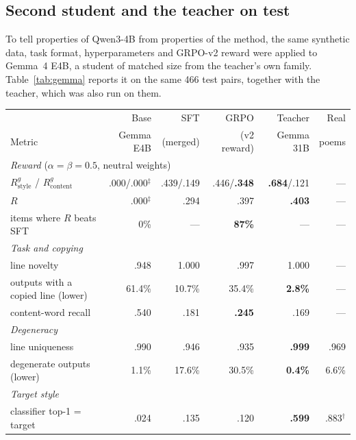 \documentclass[11pt]{article}
\begin{document}
\subsection{Second student and the teacher on test}\label{sec:gemma}

To tell properties of Qwen3-4B from properties of the method, the same
synthetic data, task format, hyperparameters and GRPO-v2 reward were applied
to Gemma~4 E4B, a student of matched size from the teacher's own family.
Table~\ref{tab:gemma} reports it on the same 466 test pairs, together with the
teacher, which was also run on them.

\begin{table}[ht]
\centering\small
\begin{tabular}{lrrrrr}
\toprule
& Base & SFT & GRPO & Teacher & Real \\
Metric & Gemma E4B & (merged) & (v2 reward) & Gemma 31B & poems \\
\midrule
\multicolumn{6}{l}{\emph{Reward} ($\alpha=\beta=0.5$, neutral weights)} \\
\quad $R^{g}_{\mathrm{style}}$ / $R^{g}_{\mathrm{content}}$ & .000/.000$^\ddagger$ & .439/.149 & .446/\textbf{.348} & \textbf{.684}/.121 & --- \\
\quad $R$                                   & .000$^\ddagger$ & .294 & .397 & \textbf{.403} & --- \\
\quad items where $R$ beats SFT             & 0\% & --- & \textbf{87\%} & --- & --- \\
\midrule
\multicolumn{6}{l}{\emph{Task and copying}} \\
\quad line novelty                          & .948 & 1.000 & .997 & 1.000 & --- \\
\quad outputs with a copied line (lower)    & 61.4\% & 10.7\% & 35.4\% & \textbf{2.8\%} & --- \\
\quad content-word recall                   & .540 & .181 & \textbf{.245} & .169 & --- \\
\midrule
\multicolumn{6}{l}{\emph{Degeneracy}} \\
\quad line uniqueness                       & .990 & .946 & .935 & \textbf{.999} & .969 \\
\quad degenerate outputs (lower)            & 1.1\% & 17.6\% & 30.5\% & \textbf{0.4\%} & 6.6\% \\
\midrule
\multicolumn{6}{l}{\emph{Target style}} \\
\quad classifier top-1 = target             & .024 & .135 & .120 & \textbf{.599} & .883$^\dagger$ \\

\end{tabular}
\end{table}
\end{document}
